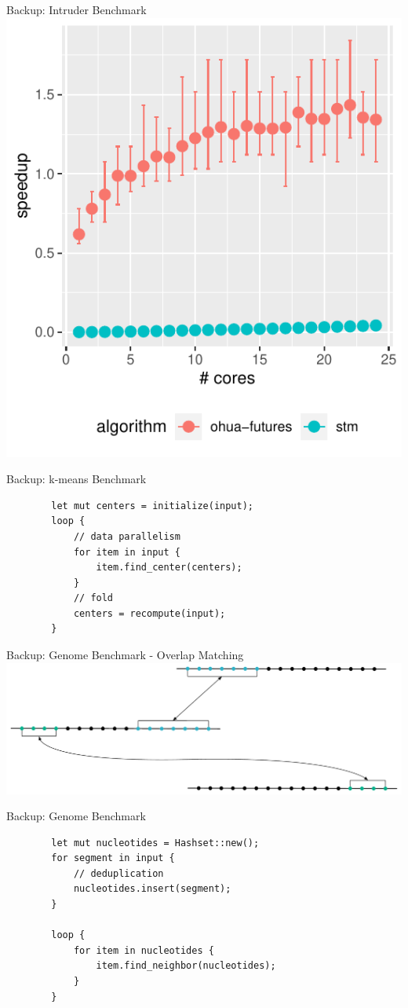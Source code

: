 \documentclass[aspectratio=169, usenames, dvipsnames]{beamer}
\begin{document}
\begin{frame}{Backup: Intruder Benchmark}
    \centering
    \includegraphics[width=.5\textwidth,height=.7\textheight,keepaspectratio]{img/results/intruder+}
\end{frame}

\begin{frame}[fragile]{Backup: k-means Benchmark}
    \centering
    \begin{verbatim}
        let mut centers = initialize(input);
        loop {
            // data parallelism
            for item in input {
                item.find_center(centers);
            }
            // fold
            centers = recompute(input);
        }
    \end{verbatim}
\end{frame}

\begin{frame}{Backup: Genome Benchmark - Overlap Matching}
    \centering
    \includegraphics[width=\textwidth,keepaspectratio]{img/experiments-genome}
\end{frame}

\begin{frame}[fragile]{Backup: Genome Benchmark}
    \centering
    \begin{verbatim}
        let mut nucleotides = Hashset::new();
        for segment in input {
            // deduplication
            nucleotides.insert(segment);
        }

        loop {
            for item in nucleotides {
                item.find_neighbor(nucleotides);
            }
        }
    \end{verbatim}
\end{frame}
\end{document}
